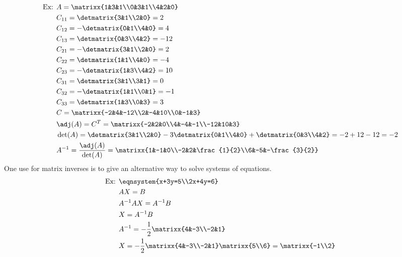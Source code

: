 \begin{align*}
    \text{Ex: }&A=\matrixx{1&3&1\\0&3&1\\4&2&0}\\
    &C_{11}=\detmatrix{3&1\\2&0}=2\\
    &C_{12}=-\detmatrix{0&1\\4&0}=4\\
    &C_{13}=\detmatrix{0&3\\4&2}=-12\\
    &C_{21}=-\detmatrix{3&1\\2&0}=2\\
    &C_{22}=\detmatrix{1&1\\4&0}=-4\\
    &C_{23}=-\detmatrix{1&3\\4&2}=10\\
    &C_{31}=\detmatrix{3&1\\3&1}=0\\
    &C_{32}=-\detmatrix{1&1\\0&1}=-1\\
    &C_{33}=\detmatrix{1&3\\0&3}=3\\
    &C=\matrixx{-2&4&-12\\2&-4&10\\0&-1&3}\\
    &\adj(A)=C^T=\matrixx{-2&2&0\\4&-4&-1\\-12&10&3}\\
    &\det(A)=\detmatrix{3&1\\2&0}-3\detmatrix{0&1\\4&0}+\detmatrix{0&3\\4&2}=-2+12-12=-2\\
    &A^{-1}=\frac{\adj(A)}{\det(A)}=\matrixx{1&-1&0\\-2&2&\frac{1}{2}\\6&-5&-\frac{3}{2}}
\end{align*}
One use for matrix inverses is to give an alternative way to solve systems of equations.
\begin{align*}
    \text{Ex: }&\eqnsystem{x+3y=5\\2x+4y=6}\\
    &AX=B\\
    &A^{-1}AX=A^{-1}B\\
    &X=A^{-1}B\\
    &A^{-1}=-\frac{1}{2}\matrixx{4&-3\\-2&1}\\
    &X=-\frac{1}{2}\matrixx{4&-3\\-2&1}\matrixx{5\\6}=\matrixx{-1\\2}
\end{align*}
